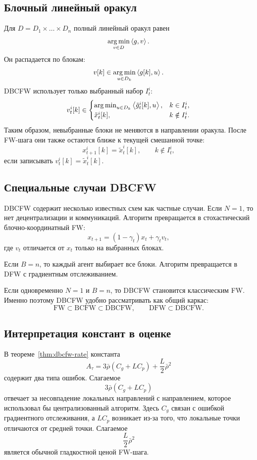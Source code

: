\subsection{Блочный линейный оракул}

Для $D=D_1\times\dots\times D_n$ полный линейный оракул равен
\[
    \operatorname*{arg\,min}_{v\in D}\left\langle g, v \right\rangle.
\]
Он распадается по блокам:
\[
    v[k]\in\operatorname*{arg\,min}_{u\in D_k}\left\langle g[k], u \right\rangle.
\]
DBCFW использует только выбранный набор $I_t^i$:
\[
    v_t^i[k]\in
    \begin{cases}
        \operatorname*{arg\,min}_{u\in D_k}\left\langle \tilde g_t^i[k], u \right\rangle, & k\in I_t^i,\\
        \tilde x_t^i[k], & k\notin I_t^i.
    \end{cases}
\]
Таким образом, невыбранные блоки не меняются в направлении оракула.
После FW-шага они также остаются ближе к текущей смешанной точке:
\[
    x_{t+1}^i[k]=\tilde x_t^i[k],
    \qquad k\notin I_t^i,
\]
если записывать $v_t^i[k]=\tilde x_t^i[k]$.

\subsection{Специальные случаи DBCFW}

DBCFW содержит несколько известных схем как частные случаи.
Если $N=1$, то нет децентрализации и коммуникаций.
Алгоритм превращается в стохастический блочно-координатный FW:
\[
    x_{t+1}=(1-\gamma_t)x_t+\gamma_tv_t,
\]
где $v_t$ отличается от $x_t$ только на выбранных блоках.

Если $B=n$, то каждый агент выбирает все блоки.
Алгоритм превращается в DFW с градиентным отслеживанием.

Если одновременно $N=1$ и $B=n$, то DBCFW становится классическим FW.
Именно поэтому DBCFW удобно рассматривать как общий каркас:
\[
    \text{FW}
    \subset
    \text{BCFW}
    \subset
    \text{DBCFW},
    \qquad
    \text{DFW}
    \subset
    \text{DBCFW}.
\]

\subsection{Интерпретация констант в оценке}

В теореме~\ref{thm:dbcfw-rate} константа
\[
    A_\tau=
    3\bar\rho(C_g+LC_p)+\frac{L}{2}\bar\rho^2
\]
содержит два типа ошибок.
Слагаемое
\[
    3\bar\rho(C_g+LC_p)
\]
отвечает за несовпадение локальных направлений с направлением, которое использовал бы
централизованный алгоритм.
Здесь $C_g$ связан с ошибкой градиентного отслеживания, а $LC_p$ возникает из-за того,
что локальные точки отличаются от средней точки.
Слагаемое
\[
    \frac{L}{2}\bar\rho^2
\]
является обычной гладкостной ценой FW-шага.

